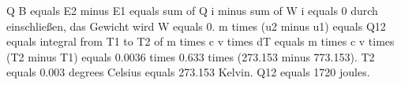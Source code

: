 Q B equals E2 minus E1 equals sum of Q i minus sum of W i equals 0 durch einschließen, das Gewicht wird W equals 0.  
m times (u2 minus u1) equals Q12 equals integral from T1 to T2 of m times c v times dT equals m times c v times (T2 minus T1) equals 0.0036 times 0.633 times (273.153 minus 773.153).  
T2 equals 0.003 degrees Celsius equals 273.153 Kelvin.  
Q12 equals 1720 joules.